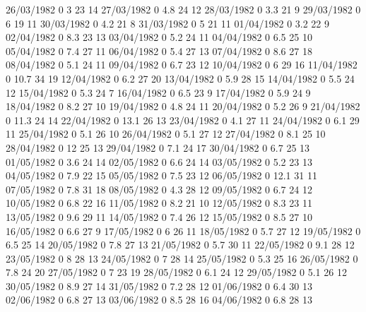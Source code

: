 26/03/1982  0      3      23     14 
27/03/1982  0      4.8    24     12 
28/03/1982  0      3.3    21     9 
29/03/1982  0      6      19     11 
30/03/1982  0      4.2    21     8 
31/03/1982  0      5      21     11 
01/04/1982  0      3.2    22     9 
02/04/1982  0      8.3    23     13 
03/04/1982  0      5.2    24     11 
04/04/1982  0      6.5    25     10 
05/04/1982  0      7.4    27     11 
06/04/1982  0      5.4    27     13 
07/04/1982  0      8.6    27     18 
08/04/1982  0      5.1    24     11 
09/04/1982  0      6.7    23     12 
10/04/1982  0      6      29     16 
11/04/1982  0      10.7   34     19 
12/04/1982  0      6.2    27     20 
13/04/1982  0      5.9    28     15 
14/04/1982  0      5.5    24     12 
15/04/1982  0      5.3    24     7 
16/04/1982  0      6.5    23     9 
17/04/1982  0      5.9    24     9 
18/04/1982  0      8.2    27     10 
19/04/1982  0      4.8    24     11 
20/04/1982  0      5.2    26     9 
21/04/1982  0      11.3   24     14 
22/04/1982  0      13.1   26     13 
23/04/1982  0      4.1    27     11 
24/04/1982  0      6.1    29     11 
25/04/1982  0      5.1    26     10 
26/04/1982  0      5.1    27     12 
27/04/1982  0      8.1    25     10 
28/04/1982  0      12     25     13 
29/04/1982  0      7.1    24     17 
30/04/1982  0      6.7    25     13 
01/05/1982  0      3.6    24     14 
02/05/1982  0      6.6    24     14 
03/05/1982  0      5.2    23     13 
04/05/1982  0      7.9    22     15 
05/05/1982  0      7.5    23     12 
06/05/1982  0      12.1   31     11 
07/05/1982  0      7.8    31     18 
08/05/1982  0      4.3    28     12 
09/05/1982  0      6.7    24     12 
10/05/1982  0      6.8    22     16 
11/05/1982  0      8.2    21     10 
12/05/1982  0      8.3    23     11 
13/05/1982  0      9.6    29     11 
14/05/1982  0      7.4    26     12 
15/05/1982  0      8.5    27     10 
16/05/1982  0      6.6    27     9 
17/05/1982  0      6      26     11 
18/05/1982  0      5.7    27     12 
19/05/1982  0      6.5    25     14 
20/05/1982  0      7.8    27     13 
21/05/1982  0      5.7    30     11 
22/05/1982  0      9.1    28     12 
23/05/1982  0      8      28     13 
24/05/1982  0      7      28     14 
25/05/1982  0      5.3    25     16 
26/05/1982  0      7.8    24     20 
27/05/1982  0      7      23     19 
28/05/1982  0      6.1    24     12 
29/05/1982  0      5.1    26     12 
30/05/1982  0      8.9    27     14 
31/05/1982  0      7.2    28     12 
01/06/1982  0      6.4    30     13 
02/06/1982  0      6.8    27     13 
03/06/1982  0      8.5    28     16 
04/06/1982  0      6.8    28     13 
